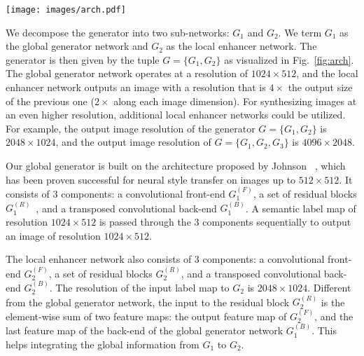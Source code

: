 \documentclass[10pt,twocolumn,letterpaper]{article}
\newcommand{\reffig}[1]{Fig.~\ref{fig:#1}}
\newcommand{\lblfig}[1]{\label{fig:#1}}
\begin{document}
\begin{figure*}[ht!]
  \centering
  \texttt{[image: images/arch.pdf]}   
  \caption{Network architecture of our generator. We first train a residual network $G_1$ on lower resolution images. Then, another residual network $G_2$ is appended to $G_1$ and the two networks are trained jointly on high resolution images. Specifically, the input to the residual blocks in $G_2$ is the element-wise sum of the feature map from $G_2$ and the last feature map from $G_1$.}
  \lblfig{arch}
\end{figure*}

 We decompose the generator into two sub-networks: $G_1$ and $G_2$. We term $G_1$ as the global generator network and $G_2$ as the local enhancer network. The generator is then given by the tuple  $G=\{G_1,G_2\}$ as visualized in \reffig{arch}. The global generator network operates at a resolution of $1024\times 512$, and the local enhancer network outputs an image with a resolution that is $4\times$ the output size of the previous one ($2\times$ along each image dimension). For synthesizing images at an even higher resolution, additional local enhancer networks could be utilized. For example, the output image resolution of the generator $G=\{G_1, G_2\}$ is $2048\times 1024$, and the output image resolution of $G=\{G_1, G_2, G_3\}$ is $4096\times 2048$.

Our global generator is built on the architecture proposed by Johnson \etal~\cite{johnson2016perceptual}, which has been proven successful for neural style transfer on images up to $512\times 512$. It consists of $3$ components: a convolutional front-end $G_1^{(F)}$, a set of residual blocks $G_1^{(R)}$~\cite{he2016deep}, and a transposed convolutional back-end $G_1^{(B)}$. A semantic label map of resolution $1024\times 512$ is passed through the 3 components sequentially to output an image of resolution $1024\times 512$.

The local enhancer network also consists of 3 components: a convolutional front-end $G_2^{(F)}$, a set of residual blocks $G_2^{(R)}$, and a transposed convolutional back-end $G_2^{(B)}$. The resolution of the input label map to $G_2$ is $2048\times 1024$. Different from the global generator network, the input to the residual block $G_2^{(R)}$ is the element-wise sum of two feature maps: the output feature map of $G_2^{(F)}$, and the last feature map of the back-end of the global generator network $G_1^{(B)}$. This helps integrating the global information from $G_1$ to $G_2$. 
\end{document}
